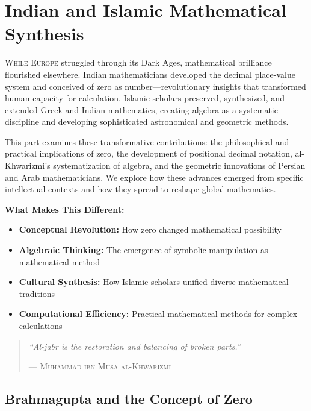 
\part{Indian and Islamic Mathematical Synthesis}
\label{part:indian-islamic}

\begin{partintro}
\lettrine[lines=3]{W}{hile Europe} struggled through its Dark Ages, mathematical brilliance flourished elsewhere. Indian mathematicians developed the decimal place-value system and conceived of zero as number—revolutionary insights that transformed human capacity for calculation. Islamic scholars preserved, synthesized, and extended Greek and Indian mathematics, creating algebra as a systematic discipline and developing sophisticated astronomical and geometric methods.

This part examines these transformative contributions: the philosophical and practical implications of zero, the development of positional decimal notation, al-Khwarizmi's systematization of algebra, and the geometric innovations of Persian and Arab mathematicians. We explore how these advances emerged from specific intellectual contexts and how they spread to reshape global mathematics.

\vspace{1em}
\textbf{What Makes This Different:}
\begin{itemize}[noitemsep]
    \item \textbf{Conceptual Revolution:} How zero changed mathematical possibility
    \item \textbf{Algebraic Thinking:} The emergence of symbolic manipulation as mathematical method
    \item \textbf{Cultural Synthesis:} How Islamic scholars unified diverse mathematical traditions
    \item \textbf{Computational Efficiency:} Practical mathematical methods for complex calculations
\end{itemize}

\begin{quote}
\textit{``Al-jabr is the restoration and balancing of broken parts.''}

\hfill--- \textsc{Muhammad ibn Musa al-Khwarizmi}
\end{quote}
\end{partintro}

\chapter{Brahmagupta and the Concept of Zero  }
